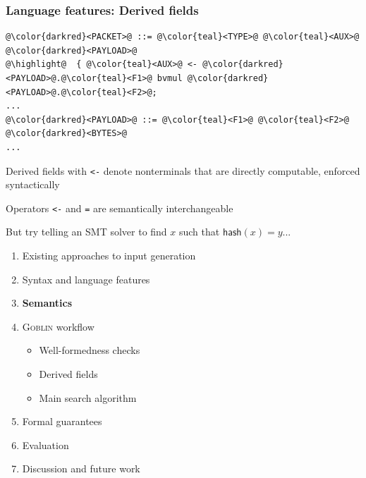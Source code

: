\documentclass[11pt,xcolor={dvipsnames},hyperref={pdftex,pdfpagemode=UseNone,hidelinks,pdfdisplaydoctitle=true},usepdftitle=false]{beamer}
\newcommand{\system}{\textsc{Goblin}}
\newcommand{\green}[1]{\textcolor{green!60!black}{#1}}
\newcommand{\blue}[1]{\textcolor{blue!70!black}{#1}}
\begin{document}
\begin{frame}[fragile]
    \frametitle{Language features: Derived fields}
\begin{lstlisting}[style=goblin]
@\color{darkred}<PACKET>@ ::= @\color{teal}<TYPE>@ @\color{teal}<AUX>@ @\color{darkred}<PAYLOAD>@
@\highlight@  { @\color{teal}<AUX>@ <- @\color{darkred}<PAYLOAD>@.@\color{teal}<F1>@ bvmul @\color{darkred}<PAYLOAD>@.@\color{teal}<F2>@;
...
@\color{darkred}<PAYLOAD>@ ::= @\color{teal}<F1>@ @\color{teal}<F2>@ @\color{darkred}<BYTES>@ 
...
\end{lstlisting} 
\green{Derived fields} with \blue{\scriptsize\texttt{<-}} denote nonterminals that are directly computable, enforced syntactically\pause 

Operators \blue{\scriptsize\texttt{<-}} and \blue{\scriptsize\texttt{=}} are semantically interchangeable\pause 

But try telling an SMT solver to find \blue{$x$} such that \blue{$\mathsf{hash}(x) = y$}...
\end{frame}


\begin{frame}
\begin{enumerate}
  \item Existing approaches to input generation
  \item Syntax and language features
  \item \green{\textbf{Semantics}}
  \item \system{} workflow
  \begin{itemize}
    \item Well-formedness checks
    \item Derived fields
    \item Main search algorithm
  \end{itemize}
  \item Formal guarantees
  \item Evaluation
  \item Discussion and future work
\end{enumerate}
\end{frame}
\end{document}
